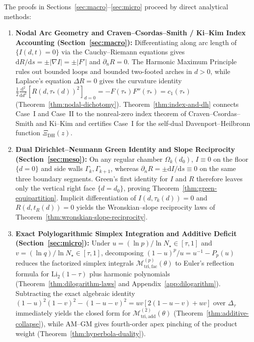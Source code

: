 \documentclass[11pt,reqno]{amsart}
\theoremstyle{definition}
\theoremstyle{remark}
\numberwithin{equation}{section}
\newcommand{\dd}{\mathrm{d}}
\newcommand{\Li}{\mathrm{Li}}
\newcommand{\DHf}{\mathrm{DH}}
\newcommand{\tri}{\mathrm{tri}}
\newcommand{\facw}{\mathrm{fac}}
\newcommand{\addw}{\mathrm{add}}
\begin{document}
The proofs in Sections~\ref{sec:macro}--\ref{sec:micro} proceed by direct analytical methods:
\begin{enumerate}[label=\textbf{Step \arabic*.},leftmargin=4.2em]
\item \textbf{Nodal Arc Geometry and Craven--Csordas--Smith / Ki--Kim Index Accounting (Section~\ref{sec:macro}):} Differentiating along arc length of $\{I(d,t)=0\}$ via the Cauchy--Riemann equations gives $\dd R/\dd s = \pm|\nabla I| = \pm|F'|$ and $\partial_n R = 0$. The Harmonic Maximum Principle rules out bounded loops and bounded two-footed arches in $d>0$, while Laplace's equation $\Delta R = 0$ gives the curvature identity $\frac{1}{2}\frac{\dd^2}{\dd d^2}[R(d,\tau_*(d))^2]_{d=0} = -F(\tau_*)F''(\tau_*) = c_1(\tau_*)$ (Theorem~\ref{thm:nodal-dichotomy}). Theorem~\ref{thm:index-and-dh} connects Case~I and Case~II to the nonreal-zero index theorem of Craven--Csordas--Smith \cite{CravenCsordasSmith1987} and Ki--Kim \cite{KiKim2000} and certifies Case~I for the self-dual Davenport--Heilbronn function $\Xi_{\DHf}(z)$.
\item \textbf{Dual Dirichlet--Neumann Green Identity and Slope Reciprocity (Section~\ref{sec:meso}):} On any regular chamber $\Omega_k(d_0)$, $I \equiv 0$ on the floor $\{d=0\}$ and side walls $\Gamma_k,\Gamma_{k+1}$, whereas $\partial_n R = \pm \dd I/\dd s \equiv 0$ on the same three boundary segments. Green's first identity for $I$ and $R$ therefore leaves only the vertical right face $\{d=d_0\}$, proving Theorem~\ref{thm:green-equipartition}. Implicit differentiation of $I(d,\tau_k(d))=0$ and $R(d,t_R(d))=0$ yields the Wronskian--slope reciprocity laws of Theorem~\ref{thm:wronskian-slope-reciprocity}.
\item \textbf{Exact Polylogarithmic Simplex Integration and Additive Deficit (Section~\ref{sec:micro}):} Under $u = (\ln p)/\ln N_\star \in [\tau,1]$ and $v = (\ln q)/\ln N_\star \in [\tau,1]$, decomposing $(1-u)^p/u = u^{-1} - P_p(u)$ reduces the factorized simplex integrals $\mathcal{M}_{\tri,\facw}^{(p)}(\theta)$ to Euler's reflection formula for $\Li_2(1-\tau)$ plus harmonic polynomials (Theorem~\ref{thm:dilogarithm-laws} and Appendix~\ref{app:dilogarithm}). Subtracting the exact algebraic identity $(1-u)^2(1-v)^2 - (1-u-v)^2 = uv[2(1-u-v)+uv]$ over $\Delta_\tau$ immediately yields the closed form for $\mathcal{M}_{\tri,\addw}^{(2)}(\theta)$ (Theorem~\ref{thm:additive-collapse}), while AM--GM gives fourth-order apex pinching of the product weight (Theorem~\ref{thm:hyperbola-duality}).
\end{enumerate}
\end{document}
